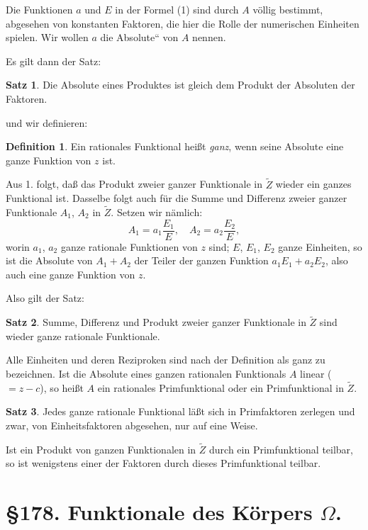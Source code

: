 \documentclass[12pt,a4paper]{article}
\theoremstyle{definition}
\newtheorem{defin}{Definition}[section]
\newtheorem{satz}{Satz}[section]
\begin{document}
Die Funktionen $a$ und $E$ in der Formel (1) sind durch $A$ völlig bestimmt, abgesehen von konstanten Faktoren, die hier die Rolle der numerischen Einheiten spielen. Wir wollen $a$ die \glqq Absolute`` von $A$ nennen.

Es gilt dann der Satz:

\begin{satz}
Die Absolute eines Produktes ist gleich dem Produkt der Absoluten der Faktoren.
\end{satz}

und wir definieren:

\begin{defin}
Ein rationales Funktional heißt \emph{ganz}, wenn seine Absolute eine ganze Funktion von $z$ ist.
\end{defin}

Aus 1. folgt, daß das Produkt zweier ganzer Funktionale in $\tilde{Z}$ wieder ein ganzes Funktional ist. Dasselbe folgt auch für die Summe und Differenz zweier ganzer Funktionale $A_1$, $A_2$ in $\tilde{Z}$. Setzen wir nämlich:
\[A_1 = a_1 \frac{E_1}{E}, \quad A_2 = a_2 \frac{E_2}{E},\]
worin $a_1$, $a_2$ ganze rationale Funktionen von $z$ sind; $E$, $E_1$, $E_2$ ganze Einheiten, so ist die Absolute von $A_1 + A_2$ der Teiler der ganzen Funktion $a_1E_1 + a_2E_2$, also auch eine ganze Funktion von $z$.

Also gilt der Satz:

\begin{satz}
Summe, Differenz und Produkt zweier ganzer Funktionale in $\tilde{Z}$ sind wieder ganze rationale Funktionale.
\end{satz}

Alle Einheiten und deren Reziproken sind nach der Definition als ganz zu bezeichnen. Ist die Absolute eines ganzen rationalen Funktionals $A$ linear ($= z - c$), so heißt $A$ ein rationales Primfunktional oder ein Primfunktional in $\tilde{Z}$.

\begin{satz}
Jedes ganze rationale Funktional läßt sich in Primfaktoren zerlegen und zwar, von Einheitsfaktoren abgesehen, nur auf eine Weise.
\end{satz}

Ist ein Produkt von ganzen Funktionalen in $\tilde{Z}$ durch ein Primfunktional teilbar, so ist wenigstens einer der Faktoren durch dieses Primfunktional teilbar.

\newpage
\section*{\S 178. Funktionale des Körpers $\Omega$.}
\end{document}
